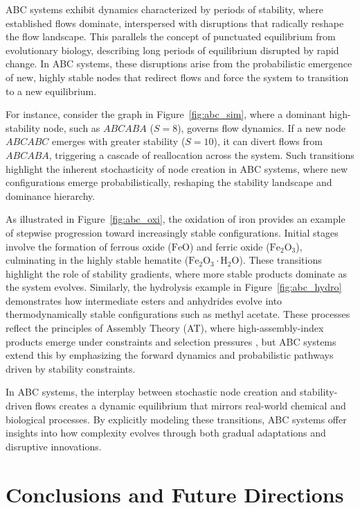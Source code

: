 \documentclass[entropy,article,submit,pdftex,oneauthor]{Definitions/mdpi}
\begin{document}
ABC systems exhibit dynamics characterized by periods of stability, where established flows dominate, interspersed with disruptions that radically reshape the flow landscape. This parallels the concept of punctuated equilibrium from evolutionary biology, describing long periods of equilibrium disrupted by rapid change. In ABC systems, these disruptions arise from the probabilistic emergence of new, highly stable nodes that redirect flows and force the system to transition to a new equilibrium.

For instance, consider the graph in Figure~\ref{fig:abc_sim}, where a dominant high-stability node, such as \( ABCABA \) (\( S = 8 \)), governs flow dynamics. If a new node \( ABCABC \) emerges with greater stability (\( S = 10 \)), it can divert flows from \( ABCABA \), triggering a cascade of reallocation across the system. Such transitions highlight the inherent stochasticity of node creation in ABC systems, where new configurations emerge probabilistically, reshaping the stability landscape and dominance hierarchy.

As illustrated in Figure~\ref{fig:abc_oxi}, the oxidation of iron provides an example of stepwise progression toward increasingly stable configurations. Initial stages involve the formation of ferrous oxide (\( \text{FeO} \)) and ferric oxide (\( \text{Fe}_2\text{O}_3 \)), culminating in the highly stable hematite (\( \text{Fe}_2\text{O}_3 \cdot \text{H}_2\text{O} \)). These transitions highlight the role of stability gradients, where more stable products dominate as the system evolves. Similarly, the hydrolysis example in Figure~\ref{fig:abc_hydro} demonstrates how intermediate esters and anhydrides evolve into thermodynamically stable configurations such as methyl acetate. These processes reflect the principles of Assembly Theory (AT), where high-assembly-index products emerge under constraints and selection pressures \cite{walker2023nature}, but ABC systems extend this by emphasizing the forward dynamics and probabilistic pathways driven by stability constraints.

In ABC systems, the interplay between stochastic node creation and stability-driven flows creates a dynamic equilibrium that mirrors real-world chemical and biological processes. By explicitly modeling these transitions, ABC systems offer insights into how complexity evolves through both gradual adaptations and disruptive innovations.


\section{Conclusions and Future Directions}
\end{document}
